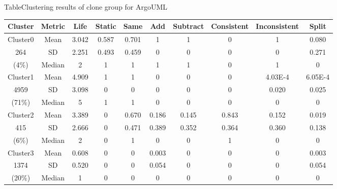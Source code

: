 \begin{table}[htbp]
{Table$\!$}{Clustering results of clone group for ArgoUML}
\vspace{0.5em}
\centering
\footnotesize
\begin{tabular}{cccccccccc}
\toprule[1.5pt]
{Cluster}&{Metric}&Life&Static &Same &Add &Subtract &Consistent &	Inconsistent &Split \\ 
\midrule[1pt]
Cluster0&Mean&	3.042	&0.587	&0.701	&1	&1	&0	&1	&0.080\\ 
264&SD&2.251	&0.493	&0.459	&0	&0	&0	&0	&0.271\\ 
(4\%)&Median	&2	&1	&1	&1  &1	&0	&1	&0\\ 
\hline
Cluster1&Mean	&4.909&1	&1	&0	&0	&0	&4.03E-4	&6.05E-4\\ 
4959&SD&3.098&0	&0	&0	&0	&0	&0.020&0.025\\ 
(71\%)&Median	&5	&1	&1	&0	&0	&0	&0	&0\\ 
\hline
Cluster2&Mean	&3.389&0	&0.670&0.186&0.145&0.843	&0.152&0.019\\ 
415&SD&2.666&0	&0.471&0.389&0.352&0.364	&0.360&0.138\\ 
(6\%)&Median	&2	&0	&1	&0	&0	&1	&0	&0\\ 
\hline
Cluster3&Mean	&0.608&0	&0	&0.003&0	&0	&0	&0.003\\ 
1374&SD&0.520&0	&0	&0.054&0	&0	&0	&0.054\\ 
(20\%)&Median	&1	&0	&0	&0	&0	&0	&0	&0\\
\bottomrule[1.5pt]
\end{tabular}
\end{table}


